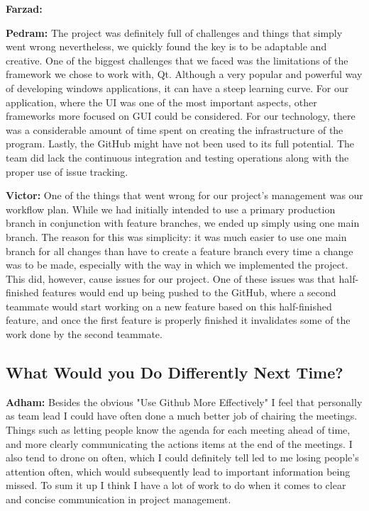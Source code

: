 \documentclass{article}
\begin{document}
\textbf{Farzad:}

\textbf{Pedram:} The project was definitely full of challenges and things that simply went wrong nevertheless, we quickly found the key is to be adaptable and creative. One of the biggest challenges that we faced was the limitations of the framework we chose to work with, Qt. Although a very popular and powerful way of developing windows applications, it can have a steep learning curve. For our application, where the UI was one of the most important aspects, other frameworks more focused on GUI could be considered. For our technology, there was a considerable amount of time spent on creating the infrastructure of the program. Lastly, the GitHub might have not been used to its full potential. The team did lack the continuous integration and testing operations along with the proper use of issue tracking. 

\textbf{Victor:} One of the things that went wrong for our project's management was our workflow plan. While we had initially intended to use a primary production branch in 
conjunction with feature branches, we ended up simply using one main branch. The reason for this was simplicity: it was much easier to use one main branch for all changes than
have to create a feature branch every time a change was to be made, especially with the way in which we implemented the project. This did, however, cause issues for our project.
One of these issues was that half-finished features would end up being pushed to the GitHub, where a second teammate would start working on a new feature based on this 
half-finished feature, and once the first feature is properly finished it invalidates some of the work done by the second teammate.

\subsection{What Would you Do Differently Next Time?}

\textbf{Adham:} Besides the obvious "Use Github More Effectively" I feel that personally as team lead I could have often done a much better job of chairing the meetings. Things
such as letting people know the agenda for each meeting ahead of time, and more clearly communicating the actions items at the end of the meetings. I also tend to drone on 
often, which I could definitely tell led to me losing people's attention often, which would subsequently lead to important information being missed. To sum it up I think I have
a lot of work to do when it comes to clear and concise communication in project management.\\
\end{document}
